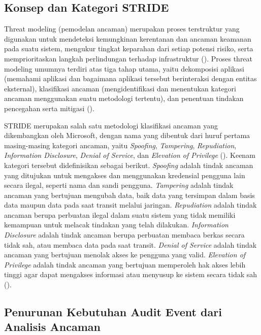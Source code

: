\subsection{Konsep dan Kategori STRIDE}
\label{subsec:konsep-kategori-stride}

Threat modeling (pemodelan ancaman) merupakan proses terstruktur yang digunakan untuk mendeteksi kemungkinan kerentanan dan ancaman keamanan pada suatu sistem, mengukur tingkat keparahan dari setiap potensi risiko, serta memprioritaskan langkah perlindungan terhadap infrastruktur (\cite{laksono2021stride}). Proses threat modeling umumnya terdiri atas tiga tahap utama, yaitu dekomposisi aplikasi (memahami aplikasi dan bagaimana aplikasi tersebut berinteraksi dengan entitas eksternal), klasifikasi ancaman (mengidentifikasi dan menentukan kategori ancaman menggunakan suatu metodologi tertentu), dan penentuan tindakan pencegahan serta mitigasi (\cite{laksono2021stride}).

STRIDE merupakan salah satu metodologi klasifikasi ancaman yang dikembangkan oleh Microsoft, dengan nama yang dibentuk dari huruf pertama masing-masing kategori ancaman, yaitu \textit{Spoofing}, \textit{Tampering}, \textit{Repudiation}, \textit{Information Disclosure}, \textit{Denial of Service}, dan \textit{Elevation of Privilege} (\cite{laksono2021stride}). Keenam kategori tersebut didefinisikan sebagai berikut. \textit{Spoofing} adalah tindak ancaman yang ditujukan untuk mengakses dan menggunakan kredensial pengguna lain secara ilegal, seperti nama dan sandi pengguna. \textit{Tampering} adalah tindak ancaman yang bertujuan mengubah data, baik data yang tersimpan dalam basis data maupun data pada saat transit melalui jaringan. \textit{Repudiation} adalah tindak ancaman berupa perbuatan ilegal dalam suatu sistem yang tidak memiliki kemampuan untuk melacak tindakan yang telah dilakukan. \textit{Information Disclosure} adalah tindak ancaman berupa perbuatan membaca berkas secara tidak sah, atau membaca data pada saat transit. \textit{Denial of Service} adalah tindak ancaman yang bertujuan menolak akses ke pengguna yang valid. \textit{Elevation of Privilege} adalah tindak ancaman yang bertujuan memperoleh hak akses lebih tinggi agar dapat mengakses informasi atau menyusup ke sistem secara tidak sah (\cite{laksono2021stride}).

\subsection{Penurunan Kebutuhan Audit Event dari Analisis Ancaman}
\label{subsec:penurunan-event-stride}

